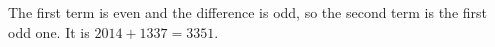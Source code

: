 The first term is even and the difference is odd, so the second term is the first odd one. It is $2014+1337=\boxed{3351}$.
